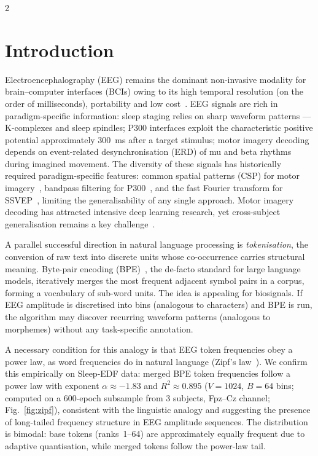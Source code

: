 \documentclass[14pt,a4paper]{extarticle}
\begin{document}
\begin{multicols}{2}

\section*{Introduction}

Electroencephalography (EEG) remains the dominant non-invasive
modality for brain--computer interfaces (BCIs) owing to its high
temporal resolution (on the order of milliseconds), portability and low
cost~\cite{lotte2018review,zhang2021survey,altaheri2023}.
EEG signals are rich in paradigm-specific information:
sleep staging relies on sharp waveform patterns ---
K-complexes and sleep spindles; P300 interfaces exploit the characteristic
positive potential approximately 300~ms after a target stimulus;
motor imagery decoding depends on event-related desynchronisation
(ERD) of mu and beta rhythms during imagined movement.
The diversity of these signals has historically required paradigm-specific
features: common spatial patterns (CSP) for motor imagery~\cite{blankertz2008csp},
bandpass filtering for P300~\cite{hoffmann2008p300}, and the fast
Fourier transform for SSVEP~\cite{nakanishi2018ssvep}, limiting
the generalisability of any single approach.
Motor imagery decoding has attracted intensive deep learning research,
yet cross-subject generalisation remains a key challenge~\cite{altaheri2023,autthasan2022}.

A parallel successful direction in natural language processing is
\emph{tokenisation}, the conversion of raw text into discrete units whose
co-occurrence carries structural meaning.
Byte-pair encoding (BPE)~\cite{sennrich2016bpe}, the de-facto standard
for large language models, iteratively merges the most frequent adjacent
symbol pairs in a corpus, forming a vocabulary of sub-word units.
The idea is appealing for biosignals.
If EEG amplitude is discretised into bins (analogous to characters)
and BPE is run, the algorithm may discover recurring waveform patterns
(analogous to morphemes) without any task-specific annotation.

A necessary condition for this analogy is that EEG token frequencies
obey a power law, as word frequencies do in natural language
(Zipf's law~\cite{zipf1949}).
We confirm this empirically on Sleep-EDF data: merged BPE token frequencies
follow a power law with exponent $\alpha \approx -1.83$
and $R^2 \approx 0.895$ ($V{=}1024$, $B{=}64$ bins; computed on a
600-epoch subsample from 3 subjects, Fpz--Cz channel; Fig.~\ref{fig:zipf}),
consistent with the linguistic analogy and suggesting the presence
of long-tailed frequency structure in EEG amplitude sequences.
The distribution is bimodal: base tokens (ranks~1--64) are approximately
equally frequent due to adaptive quantisation, while merged tokens follow
the power-law tail.


\end{multicols}
\end{document}
